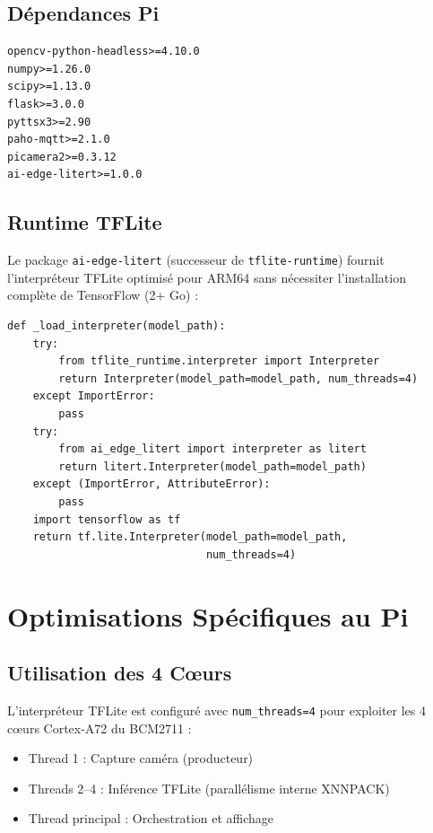 \subsection{Dépendances Pi}

\begin{lstlisting}[style=python, caption={requirements\_pi.txt}]
opencv-python-headless>=4.10.0
numpy>=1.26.0
scipy>=1.13.0
flask>=3.0.0
pyttsx3>=2.90
paho-mqtt>=2.1.0
picamera2>=0.3.12
ai-edge-litert>=1.0.0
\end{lstlisting}

\subsection{Runtime TFLite}

Le package \texttt{ai-edge-litert} (successeur de \texttt{tflite-runtime}) fournit l'interpréteur TFLite optimisé pour ARM64 sans nécessiter l'installation complète de TensorFlow (2+ Go) :

\begin{lstlisting}[style=python, caption={Chargement adaptatif de l'interpréteur TFLite}]
def _load_interpreter(model_path):
    try:
        from tflite_runtime.interpreter import Interpreter
        return Interpreter(model_path=model_path, num_threads=4)
    except ImportError:
        pass
    try:
        from ai_edge_litert import interpreter as litert
        return litert.Interpreter(model_path=model_path)
    except (ImportError, AttributeError):
        pass
    import tensorflow as tf
    return tf.lite.Interpreter(model_path=model_path,
                               num_threads=4)
\end{lstlisting}

\section{Optimisations Spécifiques au Pi}

\subsection{Utilisation des 4 Cœurs}

L'interpréteur TFLite est configuré avec \texttt{num\_threads=4} pour exploiter les 4 cœurs Cortex-A72 du BCM2711 :

\begin{itemize}
    \item Thread 1 : Capture caméra (producteur)
    \item Threads 2--4 : Inférence TFLite (parallélisme interne XNNPACK)
    \item Thread principal : Orchestration et affichage
\end{itemize}

